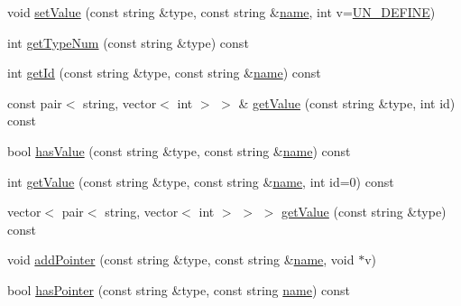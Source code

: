 \begin{DoxyCompactItemize}
\item 
void \mbox{\hyperlink{classgraphsat_1_1_uppaal_template_data_ac06f0426517095016aaa34fe0b933ff1}{set\+Value}} (const string \&type, const string \&\mbox{\hyperlink{classgraphsat_1_1_uppaal_template_data_ad692037efd6f8c30ec30920cee8fef02}{name}}, int v=\mbox{\hyperlink{namespacegraphsat_ac495a5bfce375af1b4d9a8e3f75bef9e}{U\+N\+\_\+\+D\+E\+F\+I\+NE}})
\item 
int \mbox{\hyperlink{classgraphsat_1_1_uppaal_template_data_a68e36b69f936aea39f9bb0c76d7c1dc9}{get\+Type\+Num}} (const string \&type) const
\item 
int \mbox{\hyperlink{classgraphsat_1_1_uppaal_template_data_ab7517b8ab8d2c8372536603fb2dbf406}{get\+Id}} (const string \&type, const string \&\mbox{\hyperlink{classgraphsat_1_1_uppaal_template_data_ad692037efd6f8c30ec30920cee8fef02}{name}}) const
\item 
const pair$<$ string, vector$<$ int $>$ $>$ \& \mbox{\hyperlink{classgraphsat_1_1_uppaal_template_data_a72fc224f253fa49d0059cf81fe3f3d5d}{get\+Value}} (const string \&type, int id) const
\item 
bool \mbox{\hyperlink{classgraphsat_1_1_uppaal_template_data_a72b77355129690fecd51e9641923d4e0}{has\+Value}} (const string \&type, const string \&\mbox{\hyperlink{classgraphsat_1_1_uppaal_template_data_ad692037efd6f8c30ec30920cee8fef02}{name}}) const
\item 
int \mbox{\hyperlink{classgraphsat_1_1_uppaal_template_data_a984e6f2c3acbfa11b3ab974f64a62b94}{get\+Value}} (const string \&type, const string \&\mbox{\hyperlink{classgraphsat_1_1_uppaal_template_data_ad692037efd6f8c30ec30920cee8fef02}{name}}, int id=0) const
\item 
vector$<$ pair$<$ string, vector$<$ int $>$ $>$ $>$ \mbox{\hyperlink{classgraphsat_1_1_uppaal_template_data_a6721645921deae3e0d24fbf36b8a7827}{get\+Value}} (const string \&type) const
\item 
void \mbox{\hyperlink{classgraphsat_1_1_uppaal_template_data_ab6ba35a0dce5f2ac086e11361aafcaec}{add\+Pointer}} (const string \&type, const string \&\mbox{\hyperlink{classgraphsat_1_1_uppaal_template_data_ad692037efd6f8c30ec30920cee8fef02}{name}}, void $\ast$v)
\item 
bool \mbox{\hyperlink{classgraphsat_1_1_uppaal_template_data_a504ceabe99897f4e43877d3c2dbf0c46}{has\+Pointer}} (const string \&type, const string \mbox{\hyperlink{classgraphsat_1_1_uppaal_template_data_ad692037efd6f8c30ec30920cee8fef02}{name}}) const
\item 

\end{DoxyCompactItemize}
